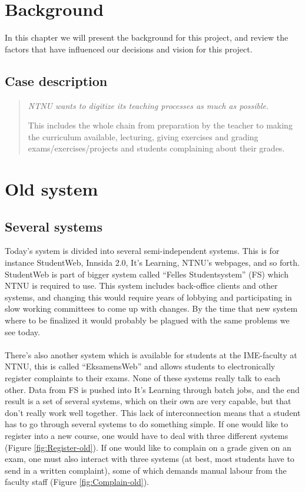 \section{Background}
In this chapter we will present the background for this project, and review the factors that have
influenced our decisions and vision for this project.

\subsection{Case description}

\begin{quotation}
  \em NTNU wants to digitize its teaching processes as much as possible.\newline

   This includes the whole chain from preparation by the teacher to making the curriculum available, lecturing, giving exercises and grading exams/exercises/projects and students complaining about their grades.
\end{quotation}

\section{Old system}
\subsection{Several systems}
Today's system is divided into several semi-independent systems. This is for instance StudentWeb, Innsida 2.0, It's Learning, NTNU's webpages, and so forth. 
StudentWeb is part of bigger system called ``Felles Studentsystem'' (FS) which NTNU is required to use. This system includes back-office clients and other systems, and changing this
would require years of lobbying and participating in slow working committees to come up with changes. By the time that new system where to be finalized it would probably be plagued with the same problems we see today.
~\\\\
 There's also another system which is available for students at the IME-faculty at NTNU, this is called ``EksamensWeb'' and allows students to electronically register complaints to 
 their exams. None of these systems really talk to each other. Data from FS is pushed into It's Learning through batch jobs, and the end result is a set of several systems, which on their own are very capable, but that don't really work well together.  
 This lack of interconnection means that a student has to go through several systems to do something simple. If one would like to register into a new course, one would have to deal with three different systems (Figure \ref{fig:Register-old}). If one would like to complain on a grade given on an exam, one must also interact with three systems (at best, most students have to send in a written complaint), some of which demands manual labour from the faculty staff (Figure \ref{fig:Complain-old}).

